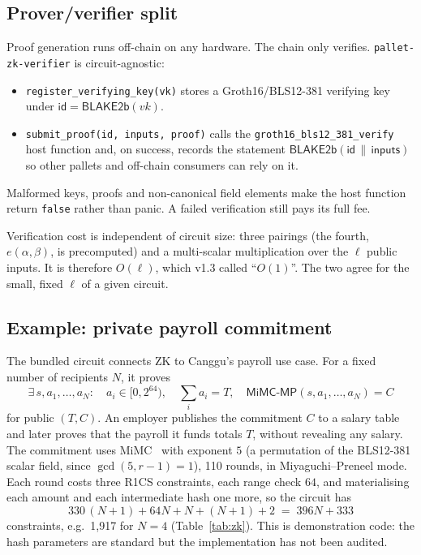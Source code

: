\documentclass[11pt]{article}
\theoremstyle{definition}
\theoremstyle{remark}
\begin{document}
\subsection{Prover/verifier split}
Proof generation runs off-chain on any hardware. The chain only verifies. \texttt{pallet-zk-verifier}
is circuit-agnostic:
\begin{itemize}[leftmargin=*]
  \item \texttt{register\_verifying\_key(vk)} stores a Groth16/BLS12-381 verifying key under
        $\mathsf{id} = \mathsf{BLAKE2b}(vk)$.
  \item \texttt{submit\_proof(id, inputs, proof)} calls the \texttt{groth16\_bls12\_381\_verify}
        host function and, on success, records the statement $\mathsf{BLAKE2b}(\mathsf{id}\,\|\,
        \mathsf{inputs})$ so other pallets and off-chain consumers can rely on it.
\end{itemize}
Malformed keys, proofs and non-canonical field elements make the host function return
\texttt{false} rather than panic. A failed verification still pays its full fee.

Verification cost is independent of circuit size: three pairings (the fourth,
$e(\alpha,\beta)$, is precomputed) and a multi-scalar multiplication over the $\ell$ public inputs.
It is therefore $O(\ell)$, which v1.3 called ``$O(1)$''. The two agree for the small, fixed $\ell$
of a given circuit.

\subsection{Example: private payroll commitment}

The bundled circuit connects ZK to Canggu's payroll use case. For a fixed number of recipients $N$,
it proves
\[
\exists\, s, a_1, \dots, a_N:\quad a_i \in [0, 2^{64}),\quad \sum_i a_i = T,\quad
\mathsf{MiMC\text{-}MP}(s, a_1,\dots,a_N) = C
\]
for public $(T, C)$. An employer publishes the commitment $C$ to a salary table and later proves
that the payroll it funds totals $T$, without revealing any salary. The commitment uses
MiMC~\cite{mimc} with exponent $5$ (a permutation of the BLS12-381 scalar field, since
$\gcd(5, r-1)=1$), 110 rounds, in Miyaguchi--Preneel mode. Each round costs three R1CS constraints,
each range check $64$, and materialising each amount and each intermediate hash one more, so the
circuit has
\[
330\,(N+1) + 64N + N + (N+1) + 2 \;=\; 396N + 333
\]
constraints, e.g.\ 1{,}917 for $N = 4$ (Table~\ref{tab:zk}). This is demonstration code: the hash parameters are
standard but the implementation has not been audited.
\end{document}

